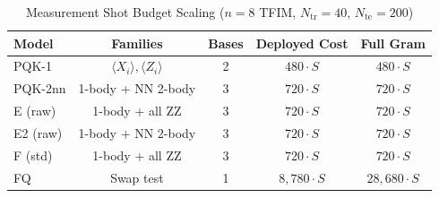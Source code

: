\begin{table}[!t]
\caption{Measurement Shot Budget Scaling ($n=8$ TFIM, $N_{\mathrm{tr}}=40$, $N_{\mathrm{te}}=200$)}
\label{tab:shot_costs}
\centering
\begingroup
\setlength{\tabcolsep}{4pt}
\begin{tabular}{@{}lcccc@{}}
\toprule
\textbf{Model} & \textbf{Families} & \textbf{Bases} & \textbf{Deployed Cost} & \textbf{Full Gram} \\
\midrule
PQK-1 & $\langle X_i \rangle, \langle Z_i \rangle$ & 2 & $480 \cdot S$ & $480 \cdot S$ \\
PQK-2nn & 1-body + NN 2-body & 3 & $720 \cdot S$ & $720 \cdot S$ \\
E (raw) & 1-body + all ZZ & 3 & $720 \cdot S$ & $720 \cdot S$ \\
E2 (raw) & 1-body + NN 2-body & 3 & $720 \cdot S$ & $720 \cdot S$ \\
F (std) & 1-body + all ZZ & 3 & $720 \cdot S$ & $720 \cdot S$ \\
FQ & Swap test & 1 & $8{,}780 \cdot S$ & $28{,}680 \cdot S$ \\
\bottomrule
\end{tabular}
\endgroup
\end{table}
